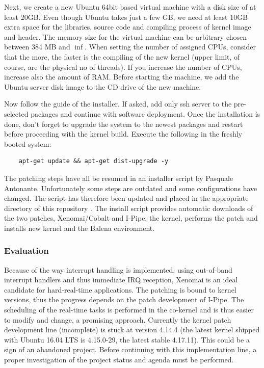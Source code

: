 \documentclass[]{scrartcl}
\begin{document}
Next, we create a new Ubuntu 64bit based virtual machine with a disk size of at least 20GB. 
Even though Ubuntu takes just a few GB, we need at least 10GB extra space for the libraries, source code and compiling process of kernel image and header. 
The memory size for the virtual machine can be arbitrary chosen between 384 MB and $\inf$. When setting the number of assigned CPUs, consider that the more, the faster is the compiling of the new kernel (upper limit, of course, are the physical no of threads). 
If you increase the number of CPUs, increase also the amount of RAM.
Before starting the machine, we add the Ubuntu server disk image to the CD drive of the new machine.

Now follow the guide of the installer. If asked, add only ssh server to the pre-selected packages and continue with software deployment. 
Once the installation is done, don't forget to upgrade the system to the newest packages and restart before proceeding with the kernel build.
Execute the following in the freshly booted system:

\begin{verbatim}
	apt-get update && apt-get dist-upgrade -y
\end{verbatim}

The patching steps have all be resumed in an installer script by Pasquale Antonante. Unfortunately some steps are outdated and some configurations have changed.
The script has therefore been updated and placed in the appropriate directory of this repository \cite{gitrepo}. 
The install script provides automatic downloads of the two patches, Xenomai/Cobalt and I-Pipe, the kernel, performs the patch and installs new kernel and the Balena environment.

\subsubsection{Evaluation}

Because of the way interrupt handling is implemented, using out-of-band interrupt handlers and thus immediate IRQ reception, Xenomai is an ideal candidate for hard-real-time applications. 
The patching is bound to kernel versions, thus the progress depends on the patch development of I-Pipe. 
The scheduling of the real-time tasks is performed in the co-kernel and is thus easier to modify and change, a promising approach.
Currently the kernel patch development line (incomplete) is stuck at version 4.14.4 (the latest kernel shipped with Ubuntu 16.04 LTS is 4.15.0-29, the latest stable 4.17.11). 
This could be a sign of an abandoned project. Before continuing with this implementation line, a proper investigation of the project status and agenda must be performed.
\end{document}

